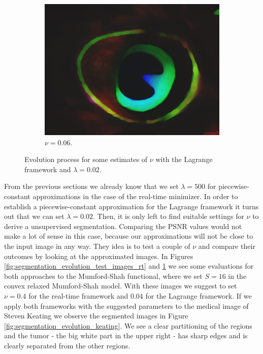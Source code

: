 \documentclass[abstracton]{scrreprt}
\begin{document}
\begin{figure}[!ht]
\begin{subfigure}[b]{0.16\textwidth}
                    \includegraphics[width=\textwidth]{img/segmentation/cr/006peacock-feather.png}
                    \caption{$\nu = 0.06$.}
                \end{subfigure}
                \caption[Evolution process for image segmentation with Lagrange Mumford-Shah.]{Evolution process for some estimates of $\nu$ with the Lagrange framework and $\lambda = 0.02$.}
            \label{fig:segmentation_evolution_test_images_cr}
            \end{figure}
            From the previous sections we already know that we set $\lambda = 500$ for piecewise-constant approximations in the case of the real-time minimizer. In order to establish a piecewise-constant approximation for the Lagrange framework it turns out that we can set $\lambda = 0.02$. Then, it is only left to find suitable settings for $\nu$ to derive a unsupervised segmentation. Comparing the PSNR values would not make a lot of sense in this case, because our approximations will not be close to the input image in any way. They idea is to test a couple of $\nu$ and compare their outcomes by looking at the approximated images. In Figures \ref{fig:segmentation_evolution_test_images_rt} and \ref{fig:segmentation_evolution_test_images_cr} we see some evaluations for both approaches to the Mumford-Shah functional, where we set $S = 16$ in the convex relaxed Mumford-Shah model. With these images we suggest to set $\nu = 0.4$ for the real-time framework and $0.04$ for the Lagrange framework. If we apply both frameworks with the suggested parameters to the medical image of Steven Keating we observe the segmented images in Figure \ref{fig:segmentation_evolution_keating}. We see a clear partitioning of the regions and the tumor - the big white part in the upper right - has sharp edges and is clearly separated from the other regions.\\\\
\end{document}
